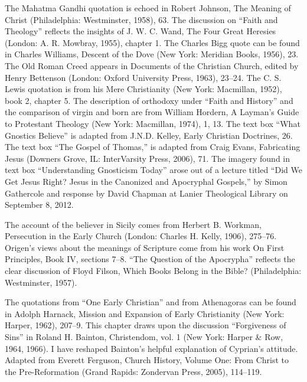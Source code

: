 \begin{notelist}
\entry The Mahatma Gandhi quotation is echoed in Robert Johnson, The Meaning of Christ
  (Philadelphia: Westminster, 1958), 63.
\entry The discussion on “Faith and Theology” reflects the insights of J. W. C. Wand, The Four Great
  Heresies (London: A. R. Mowbray, 1955), chapter 1.
\entry The Charles Bigg quote can be found in Charles Williams, Descent of the Dove (New York:
  Meridian Books, 1956), 23.
\entry The Old Roman Creed appears in Documents of the Christian Church, edited by Henry Bettenson
  (London: Oxford University Press, 1963), 23–24.
\entry The C. S. Lewis quotation is from his Mere Christianity (New York: Macmillan, 1952), book 2,
  chapter 5.
\entry The description of orthodoxy under “Faith and History” and the comparison of virgin and born
  are from William Hordern, A Layman’s Guide to Protestant Theology (New York: Macmillan, 1974), 1,
  13.
\entry The text box “What Gnostics Believe” is adapted from J.N.D. Kelley, Early Christian
  Doctrines, 26.
\entry The text box “The Gospel of Thomas,” is adapted from Craig Evans, Fabricating Jesus (Downers
  Grove, IL: InterVarsity Press, 2006), 71.
\entry The imagery found in text box “Understanding Gnosticism Today” arose out of a lecture titled
  “Did We Get Jesus Right? Jesus in the Canonized and Apocryphal Gospels,” by Simon Gathercole and
  response by David Chapman at Lanier Theological Library on September 8, 2012.
\end{notelist}

\begin{notelist}
\entry The account of the believer in Sicily comes from Herbert B. Workman, Persecution in the Early
  Church (London: Charles H. Kelly, 1906), 275–76.
\entry Origen’s views about the meanings of Scripture come from his work On First Principles, Book
  IV, sections 7–8.
\entry “The Question of the Apocrypha” reflects the clear discussion of Floyd Filson, Which Books
  Belong in the Bible? (Philadelphia: Westminster, 1957).
\end{notelist}

\begin{notelist}
\entry The quotations from “One Early Christian” and from Athenagoras can be found in Adolph
  Harnack, Mission and Expansion of Early Christianity (New York: Harper, 1962), 207–9.
\entry This chapter draws upon the discussion “Forgiveness of Sins” in Roland H. Bainton,
  Christendom, vol. 1 (New York: Harper \& Row, 1964, 1966). I have reshaped Bainton’s helpful
  explanation of Cyprian’s attitude.
\entry Adapted from Everett Ferguson, Church History, Volume One: From Christ to the Pre-Reformation
  (Grand Rapids: Zondervan Press, 2005), 114–119.
\end{notelist}

